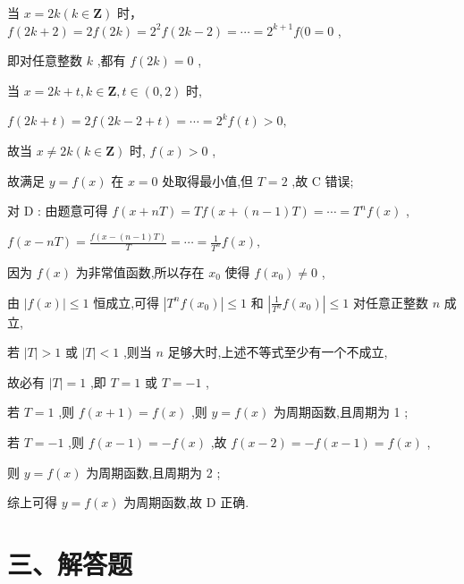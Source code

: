 \documentclass[10pt]{article}
\begin{document}
当 \(x = {2k}\left( {k \in  \mathbf{Z}}\right)\) 时， \(f\left( {{2k} + 2}\right)  = {2f}\left( {2k}\right)  = {2}^{2}f\left( {{2k} - 2}\right)  = \cdots  = {2}^{k + 1}f(0 = 0\) ,

即对任意整数 \(k\) ,都有 \(f\left( {2k}\right)  = 0\) ,

当 \(x = {2k} + t,k \in  \mathbf{Z},t \in  \left( {0,2}\right)\) 时,

\(f\left( {{2k} + t}\right)  = {2f}\left( {{2k} - 2 + t}\right)  = \cdots  = {2}^{k}f\left( t\right)  > 0,\)

故当 \(x \neq  {2k}\left( {k \in  \mathbf{Z}}\right)\) 时, \(f\left( x\right)  > 0\) ,

故满足 \(y = f\left( x\right)\) 在 \(x = 0\) 处取得最小值,但 \(T = 2\) ,故 \(\mathrm{C}\) 错误;

对 \(\mathrm{D}\) : 由题意可得 \(f\left( {x + {nT}}\right)  = {Tf}\left( {x + \left( {n - 1}\right) T}\right)  = \cdots  = {T}^{n}f\left( x\right)\) ,

\(f\left( {x - {nT}}\right)  = \frac{f\left( {x - \left( {n - 1}\right) T}\right) }{T} = \cdots  = \frac{1}{{T}^{n}}f\left( x\right) ,\)

因为 \(f\left( x\right)\) 为非常值函数,所以存在 \({x}_{0}\) 使得 \(f\left( {x}_{0}\right)  \neq  0\) ,

由 \(\left| {f\left( x\right) }\right|  \leq  1\) 恒成立,可得 \(\left| {{T}^{n}f\left( {x}_{0}\right) }\right|  \leq  1\) 和 \(\left| {\frac{1}{{T}^{n}}f\left( {x}_{0}\right) }\right|  \leq  1\) 对任意正整数 \(n\) 成立,

若 \(\left| T\right|  > 1\) 或 \(\left| T\right|  < 1\) ,则当 \(n\) 足够大时,上述不等式至少有一个不成立,

故必有 \(\left| T\right|  = 1\) ,即 \(T = 1\) 或 \(T =  - 1\) ,

若 \(T = 1\) ,则 \(f\left( {x + 1}\right)  = f\left( x\right)\) ,则 \(y = f\left( x\right)\) 为周期函数,且周期为 1 ;

若 \(T =  - 1\) ,则 \(f\left( {x - 1}\right)  =  - f\left( x\right)\) ,故 \(f\left( {x - 2}\right)  =  - f\left( {x - 1}\right)  = f\left( x\right)\) ,

则 \(y = f\left( x\right)\) 为周期函数,且周期为 2 ;

综上可得 \(y = f\left( x\right)\) 为周期函数,故 \(\mathrm{D}\) 正确.

\section*{三、解答题}
\end{document}
